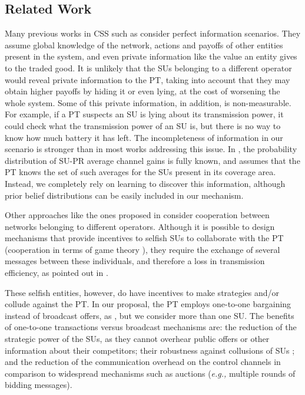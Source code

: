 \subsection{Related Work}\label{sec:Rel}
Many previous works in CSS such as \cite{ref:Simeone2008,ref:Zhang2009,ref:Yi2010,ref:Nadkar2011} consider perfect information scenarios. 
They assume global knowledge of the network, actions and payoffs of other entities present in the system, and even private information like the value an entity gives to the traded good.
It is unlikely that the SUs belonging to a different operator would reveal private information to the PT, taking into account that they may obtain higher payoffs by hiding it or even lying, at the cost of worsening the whole system. 
Some of this private information, in addition, is non-measurable. For example, if a PT suspects an SU is lying about its transmission power, it could check what the transmission power of an SU is, but there is no way to know how much battery it has left.
The incompleteness of information in our scenario is stronger than in most works addressing this issue. In \cite{ref:Duan2014}, the probability distribution of SU-PR average channel gains is fully known, and \cite{ref:Feng2014} assumes that the PT knows the set of such averages for the SUs present in its coverage area. Instead, we completely rely on learning to discover this information, although prior belief distributions can be easily included in our mechanism. 

Other approaches like the ones proposed in \cite{ref:Yuan2013,ref:Han2010,ref:Li2011} consider cooperation between networks belonging to different operators. 
Although it is possible to design mechanisms that provide incentives to selfish SUs to collaborate with the PT (cooperation in terms of game theory \cite{ref:Zhang2012_Fair}), they require the exchange of several messages between these individuals, and therefore a loss in transmission efficiency, as pointed out in \cite{ref:Niyato2008}.

These selfish entities, however, do have incentives to make strategies and/or collude against the PT. 
In our proposal, the PT employs one-to-one bargaining instead of broadcast offers, as \cite{ref:Yan2013}, but we consider more than one SU. The benefits of one-to-one transactions versus broadcast mechanisms \cite{ref:Feng2014,ref:Duan2014,ref:Jayaweera2011,ref:Zhang2009,ref:Simeone2008} are: the reduction of the strategic power of the SUs, as they cannot overhear public offers or other information about their competitors; their robustness against collusions of SUs \cite{ref:Alcaraz2014_coa}; and the reduction of the communication overhead on the control channels in comparison to widespread mechanisms such as auctions \cite{ref:Feng2014, ref:Jayaweera2011} (\textit{e.g.,} multiple rounds of bidding messages).
 
